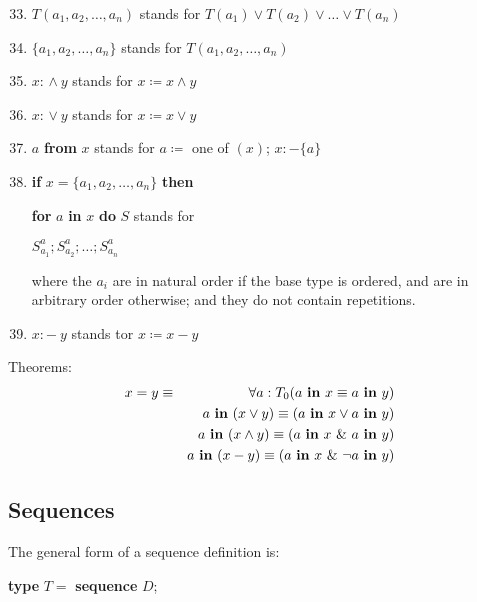 \begin{enumerate}[leftmargin=2\parindent, label=(\arabic*)]	
	\setcounter{enumi}{32}
	
	\item $T(a_1, a_2, \dots, a_n)$ stands for $T(a_1) \lor T(a_2) \lor \dots \lor T(a_n)$
	\item $\{a_1, a_2, \dots, a_n\}$ stands for $T(a_1, a_2, \dots, a_n)$
	\item $x$: $\land\ y$ stands for $x \coloneq x \land y$
	\item $x$: $\lor\ y$ stands for $x \coloneq x \lor y$
	\item $a$ \textbf{from} $x$ stands for $a \coloneq$ one of $(x)$; $x: - \{a\}$
	\item \textbf{if} $x = \{a_1, a_2, \dots, a_n\}$ \textbf{then}
	
	\quad \textbf{for} $a$ \textbf{in} $x$ \textbf{do} $S$ stands for
	
	\quad \quad $S_{a_1}^a; S_{a_2}^a ; \dots; S_{a_n}^a$
	
	where the $a_i$ are in natural order if the base type is ordered, and are in arbitrary order otherwise; and they do not contain repetitions.
	
	\item $x: -\ y$ stands tor $x \coloneq x - y$
\end{enumerate}

\noindent
Theorems:
\begin{eqnarray*}
	x = y &\equiv& \forall a:T_0(a \text{ \textbf{in} } x \equiv a \text{ \textbf{in} } y)\\
	&&a \text{ \textbf{in} } (x \lor y) \equiv (a \text{ \textbf{in} } x \lor a \text{ \textbf{in} } y) \\
	&&a \text{ \textbf{in} } (x \land y) \equiv (a \text{ \textbf{in} } x\ \&\ a \text{ \textbf{in} } y) \\
	&&a \text{ \textbf{in} } (x - y) \equiv (a \text{ \textbf{in} } x\ \&\ \neg a \text{ \textbf{in} } y) \\
\end{eqnarray*}

\subsection{Sequences}

The general form of a sequence definition is:

\quad \textbf{type} $T =$ \textbf{sequence} $D$;

